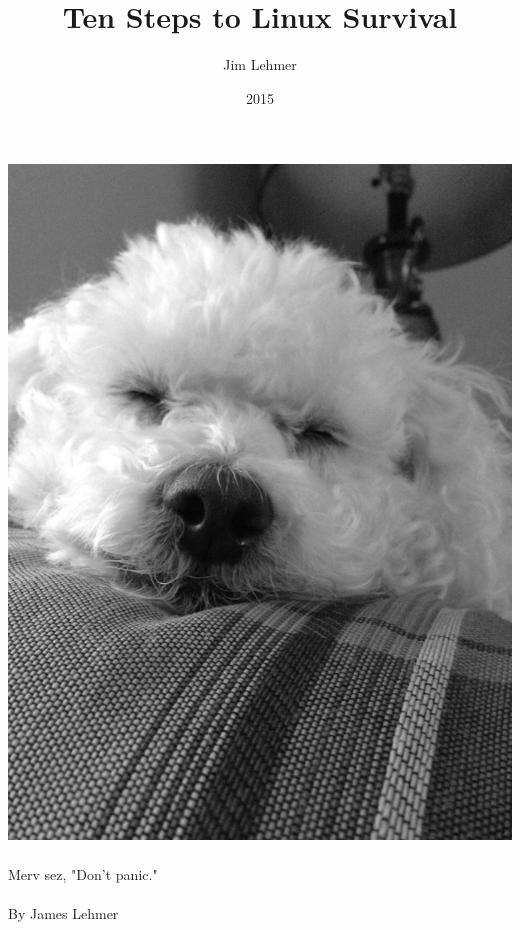 \documentclass[10pt,american,]{book}
\title{Ten Steps to Linux Survival\\\vspace{0.5em}{\large Bash for Windows People}}
\author{Jim Lehmer}
\date{2015}
\numberwithin{figure}{chapter}
\begin{document}
\maketitle

\setlength{\cftfignumwidth}{4em}
\pagestyle{empty}
\setcounter{chapter}{-2}
\renewcommand{\chaptername}{Step}
\renewcommand{\contentsname}{Steps}

{
\hypersetup{linkcolor=black}
\setcounter{tocdepth}{2}
\tableofcontents
}
\listoffigures
\cleardoublepage
\includegraphics{./images/MervBW.jpg}~\\
 Merv sez, "Don't panic." \clearpage
~\\
\hspace*{0.333em}\\
 By James Lehmer ~\\
\hspace*{0.333em}\\
\end{document}
